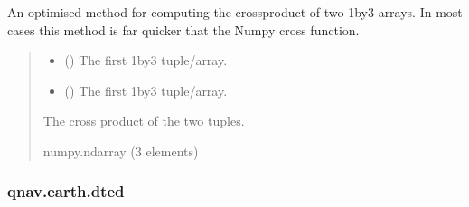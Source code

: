 \documentclass[letterpaper,10pt,english]{sphinxmanual}
\begin{document}
\begin{fulllineitems}
\label{\detokenize{modules/util/transformations:qnav.util.transformations.cross_prod_xy}}
\pysigstartsignatures
{}
\pysigstopsignatures
\sphinxAtStartPar
An optimised method for computing the cross\sphinxhyphen{}product of two 1\sphinxhyphen{}by\sphinxhyphen{}3 arrays.
In most cases this method is far quicker that the Numpy cross function.
\begin{quote}\begin{description}
\begin{itemize}
\item {} 
\sphinxAtStartPar
{} (\sphinxstyleliteralemphasis{\sphinxupquote{ (}}\sphinxstyleliteralemphasis{\sphinxupquote{)}}) \textendash{} The first 1\sphinxhyphen{}by\sphinxhyphen{}3 tuple/array.

\item {} 
\sphinxAtStartPar
{} (\sphinxstyleliteralemphasis{\sphinxupquote{ (}}\sphinxstyleliteralemphasis{\sphinxupquote{)}}) \textendash{} The first 1\sphinxhyphen{}by\sphinxhyphen{}3 tuple/array.

\end{itemize}

\sphinxAtStartPar
The cross product of the two tuples.

\sphinxAtStartPar
numpy.ndarray (3 elements)

\end{description}\end{quote}

\end{fulllineitems}


\sphinxstepscope


\subsubsection{qnav.earth.dted}
\label{\detokenize{modules/earth/dted:module-qnav.earth.dted}}\label{\detokenize{modules/earth/dted:qnav-earth-dted}}\label{\detokenize{modules/earth/dted::doc}}
\end{document}
